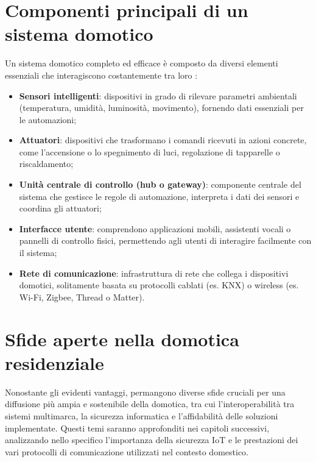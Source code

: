 \section{Componenti principali di un sistema domotico}
Un sistema domotico completo ed efficace è composto da diversi elementi essenziali che interagiscono costantemente tra loro \parencite{iecSmartHome}:
\begin{itemize}
    \item \textbf{Sensori intelligenti}: dispositivi in grado di rilevare parametri ambientali (temperatura, umidità, luminosità, movimento), fornendo dati essenziali per le automazioni;
    \item \textbf{Attuatori}: dispositivi che trasformano i comandi ricevuti in azioni concrete, come l'accensione o lo spegnimento di luci, regolazione di tapparelle o riscaldamento;
    \item \textbf{Unità centrale di controllo (hub o gateway)}: componente centrale del sistema che gestisce le regole di automazione, interpreta i dati dei sensori e coordina gli attuatori;
    \item \textbf{Interfacce utente}: comprendono applicazioni mobili, assistenti vocali o pannelli di controllo fisici, permettendo agli utenti di interagire facilmente con il sistema;
    \item \textbf{Rete di comunicazione}: infrastruttura di rete che collega i dispositivi domotici, solitamente basata su protocolli cablati (es. KNX) o wireless (es. Wi-Fi, Zigbee, Thread o Matter).
\end{itemize}

\section{Sfide aperte nella domotica residenziale}
Nonostante gli evidenti vantaggi, permangono diverse sfide cruciali per una diffusione più ampia e sostenibile della domotica, tra cui l'interoperabilità tra sistemi multimarca, la sicurezza informatica e l'affidabilità delle soluzioni implementate. Questi temi saranno approfonditi nei capitoli successivi, analizzando nello specifico l'importanza della sicurezza IoT e le prestazioni dei vari protocolli di comunicazione utilizzati nel contesto domestico.